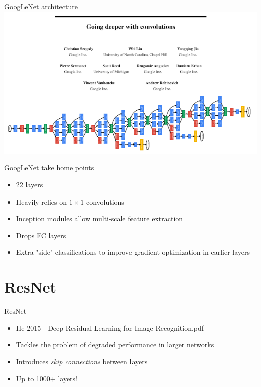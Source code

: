 \documentclass[9pt, aspectratio=169]{beamer}
\begin{document}
\begin{frame}
    {GoogLeNet architecture}
    \centering
    \includegraphics[width=\textwidth]{GoogLeNet.png}
\end{frame}

\begin{frame}
    {GoogLeNet take home points}
    \begin{itemize}
        \item 22 layers
        \item Heavily relies on $1\times 1$ convolutions
        \item Inception modules allow multi-scale feature extraction
        \item Drops FC layers
        \item Extra "side" classifications to improve gradient optimization in earlier layers
    \end{itemize}
\end{frame}

\section{ResNet}

\begin{frame}
    {ResNet}
    \begin{itemize}
        \item He 2015 - Deep Residual Learning for Image Recognition.pdf
        \item Tackles the problem of degraded performance in larger networks
        \item Introduces \textit{skip connections} between layers
        \item Up to 1000+ layers!
    \end{itemize}
\end{frame}
\end{document}
